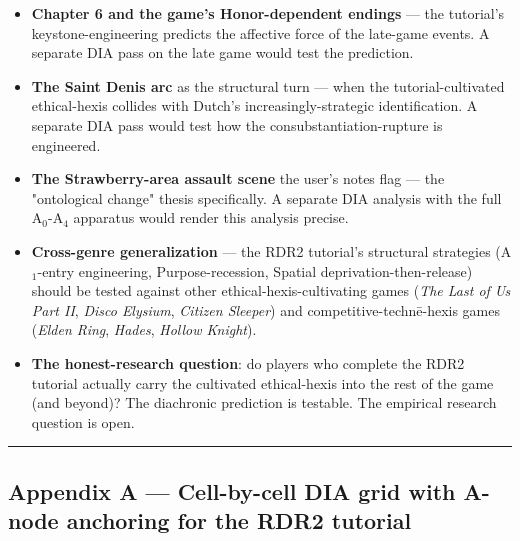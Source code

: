 \documentclass[11pt]{report}
\begin{document}
\begin{itemize}
\item \textbf{Chapter 6 and the game's Honor-dependent endings} — the tutorial's keystone-engineering predicts the affective force of the late-game events. A separate DIA pass on the late game would test the prediction.
\item \textbf{The Saint Denis arc} as the structural turn — when the tutorial-cultivated ethical-hexis collides with Dutch's increasingly-strategic identification. A separate DIA pass would test how the consubstantiation-rupture is engineered.
\item \textbf{The Strawberry-area assault scene} the user's notes flag — the "ontological change" thesis specifically. A separate DIA analysis with the full A$_0$-A$_4$ apparatus would render this analysis precise.
\item \textbf{Cross-genre generalization} — the RDR2 tutorial's structural strategies (A$_1$-entry engineering, Purpose-recession, Spatial deprivation-then-release) should be tested against other ethical-hexis-cultivating games (\textit{The Last of Us Part II}, \textit{Disco Elysium}, \textit{Citizen Sleeper}) and competitive-technē-hexis games (\textit{Elden Ring}, \textit{Hades}, \textit{Hollow Knight}).
\item \textbf{The honest-research question}: do players who complete the RDR2 tutorial actually carry the cultivated ethical-hexis into the rest of the game (and beyond)? The diachronic prediction is testable. The empirical research question is open.
\end{itemize}


\vspace{0.4em}\hrule\vspace{0.8em}


\subsection{Appendix A — Cell-by-cell DIA grid with A-node anchoring for the RDR2 tutorial}
\end{document}
